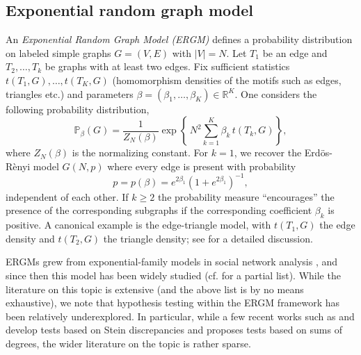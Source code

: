 \documentclass[12pt]{article}
\def\er{ Erd{\"o}s-R{\`e}nyi }
\numberwithin{equation}{section}
\begin{document}
\subsection{Exponential random graph model \label{ERGM_intro}}

An \emph{Exponential Random Graph Model (ERGM)} defines a probability distribution on labeled simple graphs \(G=(V,E)\) with \(|V|=N\). Let $T_1$ be an edge and $T_2,\ldots,T_k$ be graphs with at least two edges. Fix sufficient statistics \(t(T_1,G),\dots,t(T_K,G)\) (homomorphism densities of the motifs such as edges, triangles etc.) and parameters \(\beta=(\beta_1,\dots,\beta_K)\in\mathbb{R}^K\). One considers the following probability distribution,
\begin{equation}
\label{eq:ergm}
\mathbb{P}_\beta(G)
= \frac{1}{Z_N(\beta)}\exp\!\left\{\,N^2\sum_{k=1}^K \beta_k\, t(T_k,G)\right\},
\end{equation}
where \(Z_N(\beta)\) is the normalizing constant. 
For $k=1$, we recover the \er model $G(N,p)$ where every edge is present with probability 
\[
p = p(\beta) = e^{2\beta_1}(1+e^{2\beta_1})^{-1},
\]
independent of each other. If $k \geq 2$ the probability measure ``encourages'' the presence of the corresponding subgraphs if the corresponding coefficient $\beta_k$ is positive. A canonical example is the edge-triangle model, with \(t(T_1,G)\) the edge density and \(t(T_2,G)\) the triangle density; see \cite{chatterjee2013estimating} for a detailed discussion.

ERGMs grew from exponential-family models in social network analysis \cite{frank1986markov,holland1981exponential,wasserman1994social}, and since then this model has been widely studied (cf. \cite{park2004solution,park2005solution,chatterjee2013estimating,radin2013phaseComplex,radin2013phaseERGM,yin2013critical,shalizi2013consistency,eldan2018exponential,mukherjee2023statistics,fang2024normal,fang2025conditionalcentrallimittheorems,bhamidi2008mixing,reinert2019approximating,bresler2024metastable,ganguly2024sub,winstein2025concentration,winstein2025quantitative} for a partial list). While the literature on this topic is extensive (and the above list is by no means exhaustive), we note that hypothesis testing within the ERGM framework has been relatively underexplored. In particular, while a few recent works such as \cite{xu2021stein} and \cite{reinert2019approximating} develop tests based on Stein discrepancies and \cite{mukherjee_signal} proposes tests based on sums of degrees, the wider literature on the topic is rather sparse.
\end{document}
